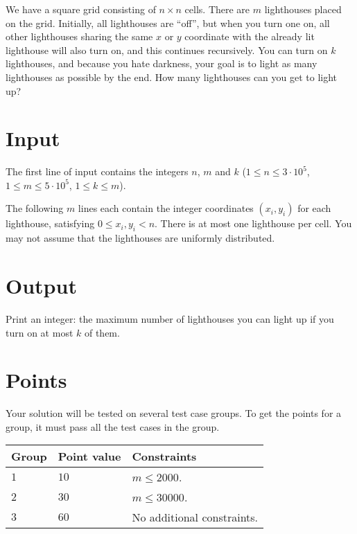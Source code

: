 \noindent

We have a square grid consisting of $n \times n$ cells. There are $m$ lighthouses placed on the grid.
Initially, all lighthouses are ``off'', but when you turn one on, all other lighthouses sharing the same
$x$ or $y$ coordinate with the already lit lighthouse will also turn on, and this continues recursively.
You can turn on $k$ lighthouses, and because you hate darkness, your goal is to light as many lighthouses
as possible by the end. How many lighthouses can you get to light up?

\section*{Input}
The first line of input contains the integers $n$, $m$ and $k$ ($1 \leq n \leq 3 \cdot 10^5$, $1 \leq m \leq 5 \cdot 10^5$, $1 \leq k \leq m$).

The following $m$ lines each contain the integer coordinates $(x_i, y_i)$ for each lighthouse, satisfying $0 \le x_i, y_i < n$.
There is at most one lighthouse per cell. You may not assume that the lighthouses are uniformly distributed.

\section*{Output}
Print an integer: the maximum number of lighthouses you can light up if you turn on at most $k$ of them.


\section*{Points}
Your solution will be tested on several test case groups.
To get the points for a group, it must pass all the test cases in the group.

\noindent
\begin{tabular}{| l | l | p{12cm} |}
  \hline
  \textbf{Group} & \textbf{Point value} & \textbf{Constraints} \\ \hline
  $1$    & $10$      & $m \leq 2000$. \\ \hline
  $2$    & $30$      & $m \leq 30000$. \\ \hline
  $3$    & $60$      & No additional constraints. \\ \hline
\end{tabular}
